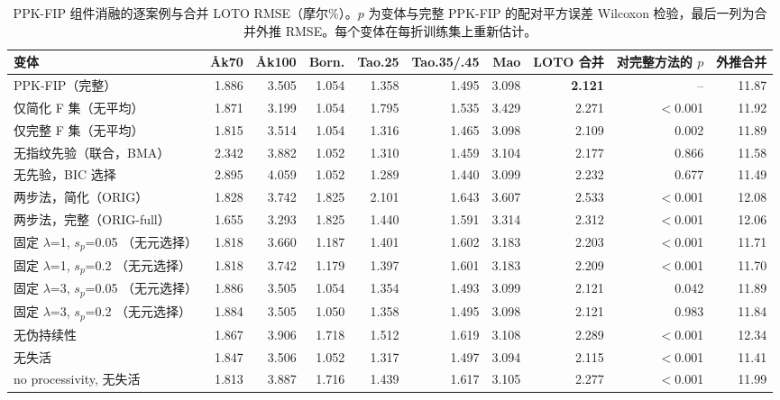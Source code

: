 \begin{table}[t]
\centering
\caption{PPK-FIP 组件消融的逐案例与合并 LOTO RMSE（摩尔\%）。$p$ 为变体与完整 PPK-FIP 的配对平方误差 Wilcoxon 检验，最后一列为合并外推 RMSE。每个变体在每折训练集上重新估计。}\label{tab:ablation}
\scriptsize
\begin{adjustbox}{max width=\linewidth}
\begin{tabular}{lrrrrrrrrr}
\toprule
变体 & Åk70 & Åk100 & Born. & Tao.25 & Tao.35/.45 & Mao & LOTO 合并 & 对完整方法的 $p$ & 外推合并 \\
\midrule
PPK-FIP（完整） & 1.886 & 3.505 & 1.054 & 1.358 & 1.495 & 3.098 & \textbf{2.121} & -- & 11.87 \\
仅简化 F 集（无平均） & 1.871 & 3.199 & 1.054 & 1.795 & 1.535 & 3.429 & 2.271 & $<$0.001 & 11.92 \\
仅完整 F 集（无平均） & 1.815 & 3.514 & 1.054 & 1.316 & 1.465 & 3.098 & 2.109 & 0.002 & 11.89 \\
无指纹先验（联合，BMA） & 2.342 & 3.882 & 1.052 & 1.310 & 1.459 & 3.104 & 2.177 & 0.866 & 11.58 \\
无先验，BIC 选择 & 2.895 & 4.059 & 1.052 & 1.289 & 1.440 & 3.099 & 2.232 & 0.677 & 11.49 \\
两步法，简化（ORIG） & 1.828 & 3.742 & 1.825 & 2.101 & 1.643 & 3.607 & 2.533 & $<$0.001 & 12.08 \\
两步法，完整（ORIG-full） & 1.655 & 3.293 & 1.825 & 1.440 & 1.591 & 3.314 & 2.312 & $<$0.001 & 12.06 \\
固定 $\lambda$=1, $s_p$=0.05 （无元选择） & 1.818 & 3.660 & 1.187 & 1.401 & 1.602 & 3.183 & 2.203 & $<$0.001 & 11.71 \\
固定 $\lambda$=1, $s_p$=0.2 （无元选择） & 1.818 & 3.742 & 1.179 & 1.397 & 1.601 & 3.183 & 2.209 & $<$0.001 & 11.70 \\
固定 $\lambda$=3, $s_p$=0.05 （无元选择） & 1.886 & 3.505 & 1.054 & 1.354 & 1.493 & 3.099 & 2.121 & 0.042 & 11.89 \\
固定 $\lambda$=3, $s_p$=0.2 （无元选择） & 1.884 & 3.505 & 1.050 & 1.358 & 1.495 & 3.098 & 2.121 & 0.983 & 11.84 \\
无伪持续性 & 1.867 & 3.906 & 1.718 & 1.512 & 1.619 & 3.108 & 2.289 & $<$0.001 & 12.34 \\
无失活 & 1.847 & 3.506 & 1.052 & 1.317 & 1.497 & 3.094 & 2.115 & $<$0.001 & 11.41 \\
no processivity, 无失活 & 1.813 & 3.887 & 1.716 & 1.439 & 1.617 & 3.105 & 2.277 & $<$0.001 & 11.99 \\
\bottomrule
\end{tabular}
\end{adjustbox}
\end{table}
